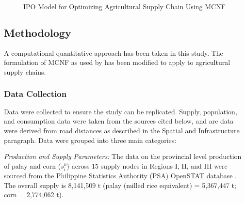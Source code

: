 \documentclass{icsthesis}
\begin{document}
\begin{mainmatter}
\begin{figure}[htbp]
\caption{IPO Model for Optimizing Agricultural Supply Chain Using MCNF}
\label{fig:ipo_model}
\end{figure}




\subsection{Methodology}
A computational quantitative approach has been taken in this study. The formulation of MCNF as used by \citet{rodrigo2018} has been modified to apply to agricultural supply chains.


\subsubsection{Data Collection}
Data were collected to ensure the study can be replicated. Supply, population, and consumption data were taken from the sources cited below, and arc data were derived from road distances as described in the Spatial and Infrastructure paragraph. Data were grouped into three main categories:

\textit{Production and Supply Parameters:} The data on the provincial level production of palay and corn ($s_i^k$) across 15 supply nodes in Regions I, II, and III were sourced from the Philippine Statistics Authority (PSA) OpenSTAT database \citep{psa2025openstat}. The overall supply is 8,141,509 t (palay (milled rice equivalent) = 5,367,447 t; corn = 2,774,062 t).


\end{mainmatter}
\end{document}
